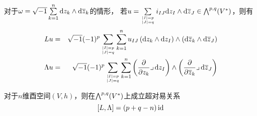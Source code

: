 
对于$\omega=\sqrt{-1}\sum\limits_{k=1}^n\mathrm{d} z_k\wedge\mathrm{d}\overline{z}_k$的情形，
若$u=\sum\limits_{|I|=p\atop |J|=q}i_{IJ}\mathrm{d} z_I\wedge\mathrm{d}\overline{z}_J
\in\bigwedge\nolimits^{p,q}(V^*)$，则有
\begin{eqnarray*}
   Lu
&=&
   \sqrt{-1}(-1)^p
   \sum_{|I|=p\atop|J|=q}
     \sum_{k=1}^{n}
       u_{IJ}
       \left(
         \mathrm{d} z_k\wedge\mathrm{d} z_I
       \right)
       \wedge
       \left(
         \mathrm{d}\overline{z}_k\wedge\mathrm{d}\overline{z}_J
       \right)
\\
  \Lambda u
&=&
   \sqrt{-1}(-1)^p
   \sum_{|I|=p\atop|J|=q}
     \sum_{k=1}^{n}
       \left(
         \frac{\partial } {\partial z_k}\lrcorner\, \mathrm{d} z_I
       \right)\wedge
       \left(
         \frac{\partial } {\partial \overline{z}_k}\lrcorner\, \mathrm{d}\overline{z}_J
       \right)
\end{eqnarray*}


\begin{prop}
对于$n$维酉空间$(V,h)$，则在$\bigwedge\nolimits^{p,q}(V^*)$上成立超对易关系
$$[L,\Lambda]=(p+q-n)\operatorname{id}$$
\end{prop}

